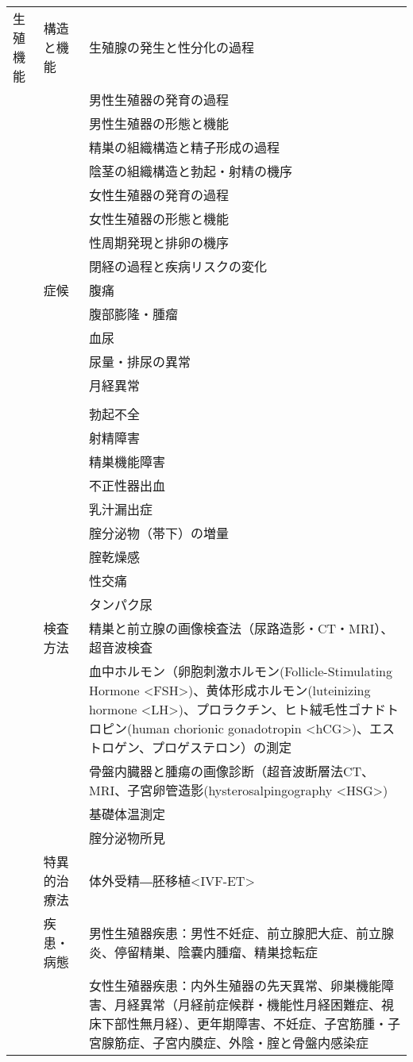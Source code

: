 \begin{xltabular}{\linewidth}{XXX}
生殖機能 & 構造と機能 & 生殖腺の発生と性分化の過程 \\
 &  & 男性生殖器の発育の過程 \\
 &  & 男性生殖器の形態と機能 \\
 &  & 精巣の組織構造と精子形成の過程 \\
 &  & 陰茎の組織構造と勃起・射精の機序 \\
 &  & 女性生殖器の発育の過程 \\
 &  & 女性生殖器の形態と機能 \\
 &  & 性周期発現と排卵の機序 \\
 &  & 閉経の過程と疾病リスクの変化 \\
 & 症候 & 腹痛 \\
 &  & 腹部膨隆・腫瘤 \\
 &  & 血尿 \\
 &  & 尿量・排尿の異常 \\
 &  & 月経異常 \\
 &  &  \\
 &  & 勃起不全 \\
 &  & 射精障害 \\
 &  & 精巣機能障害 \\
 &  & 不正性器出血 \\
 &  & 乳汁漏出症 \\
 &  & 腟分泌物（帯下）の増量 \\
 &  & 腟乾燥感 \\
 &  & 性交痛 \\
 &  & タンパク尿 \\
 & 検査方法 & 精巣と前立腺の画像検査法（尿路造影・CT・MRI）、超音波検査 \\
 &  & 血中ホルモン（卵胞刺激ホルモン(Follicle-Stimulating Hormone <FSH>)、黄体形成ホルモン(luteinizing hormone <LH>)、プロラクチン、ヒト絨毛性ゴナドトロピン(human chorionic gonadotropin <hCG>)、エストロゲン、プロゲステロン）の測定 \\
 &  & 骨盤内臓器と腫瘍の画像診断（超音波断層法CT、MRI、子宮卵管造影(hysterosalpingography <HSG>) \\
 &  & 基礎体温測定 \\
 &  & 腟分泌物所見 \\
 & 特異的治療法 & 体外受精―胚移植<IVF-ET> \\
 & 疾患・病態 & 男性生殖器疾患：男性不妊症、前立腺肥大症、前立腺炎、停留精巣、陰嚢内腫瘤、精巣捻転症 \\
 &  & 女性生殖器疾患：内外生殖器の先天異常、卵巣機能障害、月経異常（月経前症候群・機能性月経困難症、視床下部性無月経）、更年期障害、不妊症、子宮筋腫・子宮腺筋症、子宮内膜症、外陰・腟と骨盤内感染症 \\

\end{xltabular}
